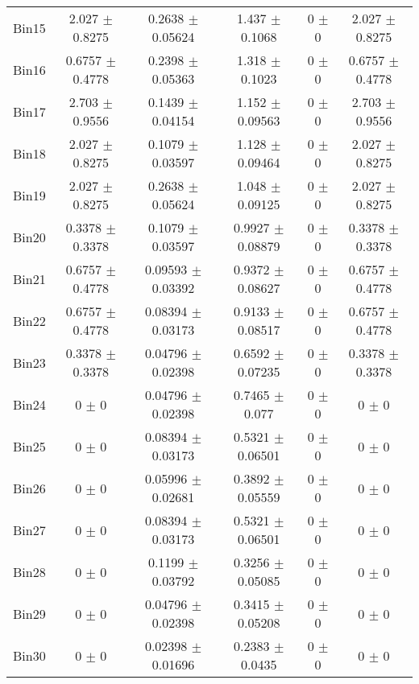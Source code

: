 \begin{tabular}{@{\extracolsep{4pt}}lccccc@{}}
     Bin15 & 2.027 $\pm$ 0.8275 & 0.2638 $\pm$ 0.05624 & 1.437 $\pm$ 0.1068 & 0 $\pm$ 0 & 2.027 $\pm$ 0.8275 \\ 
     Bin16 & 0.6757 $\pm$ 0.4778 & 0.2398 $\pm$ 0.05363 & 1.318 $\pm$ 0.1023 & 0 $\pm$ 0 & 0.6757 $\pm$ 0.4778 \\ 
     Bin17 & 2.703 $\pm$ 0.9556 & 0.1439 $\pm$ 0.04154 & 1.152 $\pm$ 0.09563 & 0 $\pm$ 0 & 2.703 $\pm$ 0.9556 \\ 
     Bin18 & 2.027 $\pm$ 0.8275 & 0.1079 $\pm$ 0.03597 & 1.128 $\pm$ 0.09464 & 0 $\pm$ 0 & 2.027 $\pm$ 0.8275 \\ 
     Bin19 & 2.027 $\pm$ 0.8275 & 0.2638 $\pm$ 0.05624 & 1.048 $\pm$ 0.09125 & 0 $\pm$ 0 & 2.027 $\pm$ 0.8275 \\ 
     Bin20 & 0.3378 $\pm$ 0.3378 & 0.1079 $\pm$ 0.03597 & 0.9927 $\pm$ 0.08879 & 0 $\pm$ 0 & 0.3378 $\pm$ 0.3378 \\ 
     Bin21 & 0.6757 $\pm$ 0.4778 & 0.09593 $\pm$ 0.03392 & 0.9372 $\pm$ 0.08627 & 0 $\pm$ 0 & 0.6757 $\pm$ 0.4778 \\ 
     Bin22 & 0.6757 $\pm$ 0.4778 & 0.08394 $\pm$ 0.03173 & 0.9133 $\pm$ 0.08517 & 0 $\pm$ 0 & 0.6757 $\pm$ 0.4778 \\ 
     Bin23 & 0.3378 $\pm$ 0.3378 & 0.04796 $\pm$ 0.02398 & 0.6592 $\pm$ 0.07235 & 0 $\pm$ 0 & 0.3378 $\pm$ 0.3378 \\ 
     Bin24 & 0 $\pm$ 0 & 0.04796 $\pm$ 0.02398 & 0.7465 $\pm$ 0.077 & 0 $\pm$ 0 & 0 $\pm$ 0 \\ 
     Bin25 & 0 $\pm$ 0 & 0.08394 $\pm$ 0.03173 & 0.5321 $\pm$ 0.06501 & 0 $\pm$ 0 & 0 $\pm$ 0 \\ 
     Bin26 & 0 $\pm$ 0 & 0.05996 $\pm$ 0.02681 & 0.3892 $\pm$ 0.05559 & 0 $\pm$ 0 & 0 $\pm$ 0 \\ 
     Bin27 & 0 $\pm$ 0 & 0.08394 $\pm$ 0.03173 & 0.5321 $\pm$ 0.06501 & 0 $\pm$ 0 & 0 $\pm$ 0 \\ 
     Bin28 & 0 $\pm$ 0 & 0.1199 $\pm$ 0.03792 & 0.3256 $\pm$ 0.05085 & 0 $\pm$ 0 & 0 $\pm$ 0 \\ 
     Bin29 & 0 $\pm$ 0 & 0.04796 $\pm$ 0.02398 & 0.3415 $\pm$ 0.05208 & 0 $\pm$ 0 & 0 $\pm$ 0 \\ 
     Bin30 & 0 $\pm$ 0 & 0.02398 $\pm$ 0.01696 & 0.2383 $\pm$ 0.0435 & 0 $\pm$ 0 & 0 $\pm$ 0 \\ 
\hline\hline
  \end{tabular}
